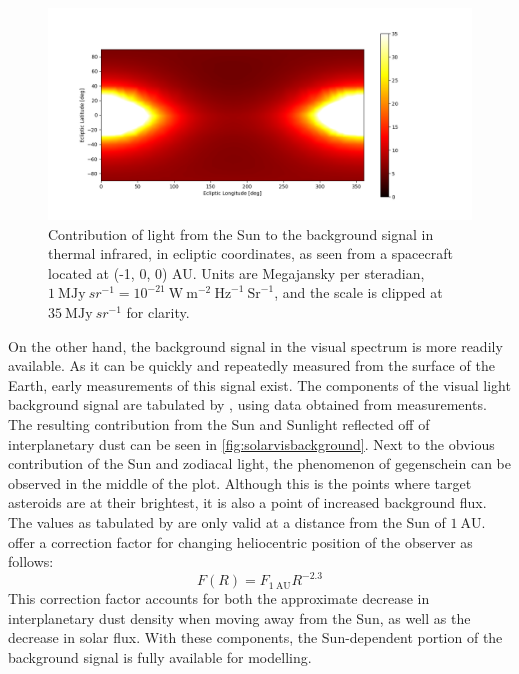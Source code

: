 \begin{figure}[htbp]
 \centering
 \includegraphics[width=1.0\textwidth]{img/background_tir_zodiac.png}
 \caption{Contribution of light from the Sun to the background signal in thermal infrared, in ecliptic coordinates, as seen from a spacecraft located at (-1, 0, 0) AU. Units are Megajansky per steradian, $1 ~\mathrm{MJy}~{sr}^{-1} = 10^{-21} ~\mathrm{W}~\mathrm{m}^{-2}~\mathrm{Hz}^{-1}~\mathrm{Sr}^{-1}$, and the scale is clipped at $35 ~\mathrm{MJy}~{sr}^{-1}$ for clarity.}
 \label{fig:solartirbackground}
\end{figure}

On the other hand, the background signal in the visual spectrum is more readily available. As it can be quickly and repeatedly measured from the surface of the Earth, early measurements of this signal exist. The components of the visual light background signal are tabulated by \cite{LightOfTheNightSky}, using data obtained from measurements. The resulting contribution from the Sun and Sunlight reflected off of interplanetary dust can be seen in \autoref{fig:solarvisbackground}. Next to the obvious contribution of the Sun and zodiacal light, the phenomenon of gegenschein can be observed in the middle of the plot. Although this is the points where target asteroids are at their brightest, it is also a point of increased background flux. The values as tabulated by \cite{LightOfTheNightSky} are only valid at a distance from the Sun of $1~\mathrm{AU}$. \cite{SkyBrightness} offer a correction factor for changing heliocentric position of the observer as follows:
\begin{equation}
 F(R) = F_{1~\mathrm{AU}}R^{-2.3}
\end{equation}
This correction factor accounts for both the approximate decrease in interplanetary dust density when moving away from the Sun, as well as the decrease in solar flux. With these components, the Sun-dependent portion of the background signal is fully available for modelling. \\

